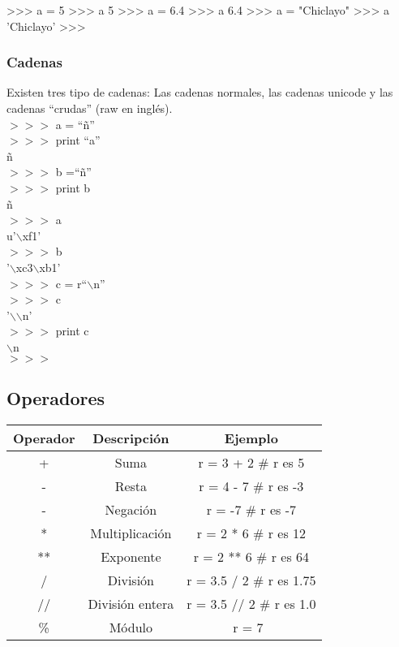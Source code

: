 \begin{pyglist} [language=python]
>>> a = 5
>>> a
5
>>> a = 6.4
>>> a
6.4
>>> a = "Chiclayo"
>>> a
'Chiclayo'
>>> 
\end{pyglist}

\subsubsection{Cadenas}

Existen tres tipo de cadenas: Las cadenas normales, las cadenas unicode y las cadenas ``crudas'' (raw en inglés).\\

$>>>$ a = ``ñ''  \\
$>>>$ print ``a''   \\
ñ               \\
$>>>$ b =``ñ''   \\
$>>>$ print b   \\
ñ               \\
$>>>$ a         \\
u'$\backslash$xf1'   \\
$>>>$ b              \\
'$\backslash$xc3$\backslash$xb1'  \\
$>>>$ c = r``$\backslash$n''        \\
$>>>$ c                           \\
'$\backslash$$\backslash$n'       \\
$>>>$ print c                     \\ 
$\backslash$n                     \\
$>>>$                             \\


\subsection{Operadores}

\begin{table}[h]
\centering
\begin{tabular}{|c|c|c|} \hline
Operador	             & Descripción & Ejemplo     \\ \hline
+         & Suma               & r = 3 + 2    \# r es 5   \\ \hline
-         & Resta              & r = 4 - 7    \# r es -3   \\ \hline
-         & Negación           & r = -7       \# r es -7   \\ \hline     
*         & Multiplicación     & r = 2 * 6    \# r es 12   \\ \hline
**        & Exponente          & r = 2 ** 6   \# r es 64    \\ \hline
/         & División           & r = 3.5 / 2  \# r es 1.75    \\ \hline
//        & División entera    & r = 3.5 // 2 \# r es 1.0    \\ \hline
\%         & Módulo             & r = 7\ %
\end{tabular}
\end{table}

